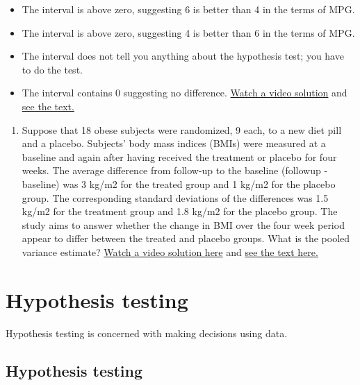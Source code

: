 \documentclass[]{article}
\begin{document}
\begin{itemize}
\itemsep1pt\parskip0pt
\item
  The interval is above zero, suggesting 6 is better than 4 in the terms
  of MPG.
\item
  The interval is above zero, suggesting 4 is better than 6 in the terms
  of MPG.
\item
  The interval does not tell you anything about the hypothesis test; you
  have to do the test.
\item
  The interval contains 0 suggesting no difference.
  \href{https://www.youtube.com/watch?v=zUVoueHLPdo\&index=25\&list=PLpl-gQkQivXhHOcVeU3bSJg78zaDYbP9L}{Watch
  a video solution} and
  \href{http://bcaffo.github.io/courses/06_StatisticalInference/homework/hw3.html\#8}{see
  the text.}
\end{itemize}

\begin{enumerate}
\def\labelenumi{\arabic{enumi}.}
\setcounter{enumi}{10}
\itemsep1pt\parskip0pt
\item
  Suppose that 18 obese subjects were randomized, 9 each, to a new diet
  pill and a placebo. Subjects' body mass indices (BMIs) were measured
  at a baseline and again after having received the treatment or placebo
  for four weeks. The average difference from follow-up to the baseline
  (followup - baseline) was 3 kg/m2 for the treated group and 1 kg/m2
  for the placebo group. The corresponding standard deviations of the
  differences was 1.5 kg/m2 for the treatment group and 1.8 kg/m2 for
  the placebo group. The study aims to answer whether the change in BMI
  over the four week period appear to differ between the treated and
  placebo groups. What is the pooled variance estimate?
  \href{https://www.youtube.com/watch?v=kzRzrrDWTRQ\&index=26\&list=PLpl-gQkQivXhHOcVeU3bSJg78zaDYbP9L}{Watch
  a video solution here} and
  \href{http://bcaffo.github.io/courses/06_StatisticalInference/homework/hw3.html\#9}{see
  the text here.}
\end{enumerate}

\newpage

\section{Hypothesis testing}\label{hypothesis-testing}

Hypothesis testing is concerned with making decisions using data.

\subsection{Hypothesis testing}\label{hypothesis-testing-1}
\end{document}
